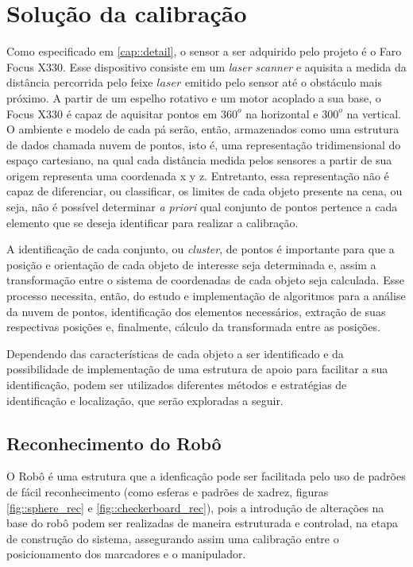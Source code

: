 \section{Solução da calibração}

Como especificado em \ref{cap::detail}, o sensor a ser adquirido pelo projeto é
o Faro Focus X330.
Esse dispositivo consiste em um \textit{laser scanner} e aquisita a medida da
distância percorrida pelo feixe $laser$ emitido pelo sensor até o obstáculo mais próximo. A partir de um
espelho rotativo e um motor acoplado a sua base, o Focus X330 é capaz de
aquisitar pontos em $360^o$ na horizontal e $300^o$ na vertical. O ambiente e
modelo de cada pá serão, então, armazenados como uma estrutura de dados chamada nuvem de
pontos, isto é, uma representação tridimensional do espaço cartesiano, na qual cada distância medida pelos
sensores a partir de sua origem representa uma coordenada x y z.
Entretanto, essa representação não é capaz de diferenciar, ou classificar, os
limites de cada objeto presente na cena, ou seja, não é possível determinar
\textit{a priori} qual conjunto de pontos pertence a cada elemento que se deseja
identificar para realizar a calibração.


A identificação de cada conjunto, ou \textit{cluster}, de pontos é importante
para que a posição e orientação de cada objeto de interesse seja determinada e,
assim a transformação entre o sistema de coordenadas de cada objeto seja
calculada. Esse processo necessita, então, do estudo e implementação de
algoritmos para a análise da nuvem de pontos, identificação dos elementos
necessários, extração de suas respectivas posições e, finalmente, cálculo da
transformada entre as posições.

Dependendo das características de cada objeto a ser identificado e da
possibilidade de implementação de uma estrutura de apoio para facilitar a sua
identificação, podem ser utilizados diferentes métodos e estratégias de
identificação e localização, que serão exploradas a seguir.

\subsection{Reconhecimento do Robô}

O Robô é uma estrutura que a idenficação pode ser facilitada pelo uso de
padrões de fácil reconhecimento (como esferas e padrões de xadrez, figuras
\ref{fig::sphere_rec} e \ref{fig::checkerboard_rec}), pois a
introdução de alterações na base do robô podem ser realizadas de maneira
estruturada e controlad, na etapa de construção do sistema, assegurando assim
uma calibração entre o posicionamento dos marcadores e o manipulador.


